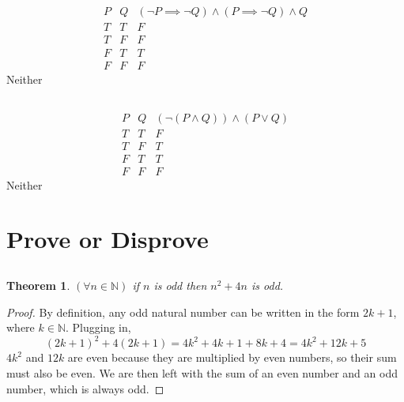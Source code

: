 \documentclass{article}
\newtheorem{genthm}{Theorem}
\newcommand{\N}{\mathbb{N}}
\begin{document}
\subsection{}

\begin{equation}
    \begin{array}{c|c|c}
        P & Q & (\lnot P \implies \lnot Q) \land (P \implies \lnot Q) \land Q \\
        \hline
        T & T & F \\
        T & F & F \\
        F & T & T \\
        F & F & F
    \end{array}
\end{equation}
Neither

\subsection{}

\begin{equation}
    \begin{array}{c|c|c}
        P & Q & (\lnot (P \land Q)) \land (P \lor Q) \\
        \hline
        T & T & F \\
        T & F & T \\
        F & T & T \\
        F & F & F
    \end{array}
\end{equation}
Neither

\section{Prove or Disprove}

\subsection{}

\begin{genthm}
    \((\forall n \in \N)\) if \(n\) is odd then \(n^2 + 4n\) is odd.
\end{genthm}
\begin{proof}
By definition, any odd natural number can be written in the form \(2k + 1\), where \(k \in \N\).
Plugging in,
\begin{equation}
    (2k + 1)^2 + 4(2k + 1) = 4k^2 + 4k + 1 + 8k + 4 = 4k^2 + 12k + 5
\end{equation}
\(4k^2\) and \(12k\) are even because they are multiplied by even numbers, so their sum must also be even.
We are then left with the sum of an even number and an odd number, which is always odd.
\end{proof}
\end{document}
